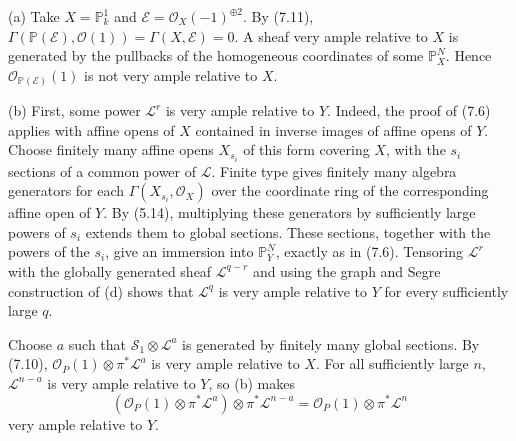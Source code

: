 (a) Take $X=\mathbb P^1_k$ and $\mathcal E=\mathcal O_X(-1)^{\oplus2}$. By (7.11), $\Gamma(\mathbb P(\mathcal E),\mathcal O(1))=\Gamma(X,\mathcal E)=0$. A sheaf very ample relative to $X$ is generated by the pullbacks of the homogeneous coordinates of some $\mathbb P_X^N$. Hence $\mathcal O_{\mathbb P(\mathcal E)}(1)$ is not very ample relative to $X$.

(b) First, some power $\mathcal L^r$ is very ample relative to $Y$. Indeed, the proof of (7.6) applies with affine opens of $X$ contained in inverse images of affine opens of $Y$. Choose finitely many affine opens $X_{s_i}$ of this form covering $X$, with the $s_i$ sections of a common power of $\mathcal L$. Finite type gives finitely many algebra generators for each $\Gamma(X_{s_i},\mathcal O_X)$ over the coordinate ring of the corresponding affine open of $Y$. By (5.14), multiplying these generators by sufficiently large powers of $s_i$ extends them to global sections. These sections, together with the powers of the $s_i$, give an immersion into $\mathbb P_Y^N$, exactly as in (7.6). Tensoring $\mathcal L^r$ with the globally generated sheaf $\mathcal L^{q-r}$ and using the graph and Segre construction of (d) shows that $\mathcal L^q$ is very ample relative to $Y$ for every sufficiently large $q$.

Choose $a$ such that $\mathcal S_1\otimes\mathcal L^a$ is generated by finitely many global sections. By (7.10), $\mathcal O_P(1)\otimes\pi^*\mathcal L^a$ is very ample relative to $X$. For all sufficiently large $n$, $\mathcal L^{n-a}$ is very ample relative to $Y$, so (b) makes
\[(\mathcal O_P(1)\otimes\pi^*\mathcal L^a)\otimes\pi^*\mathcal L^{n-a}=\mathcal O_P(1)\otimes\pi^*\mathcal L^n\]
very ample relative to $Y$.
